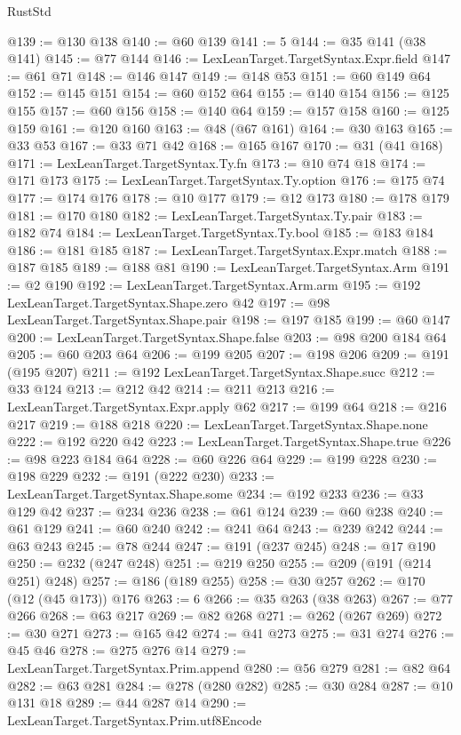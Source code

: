 \begin{lexlean}{RustStd}
\begin{coremodule}
{\begin{coremodule}
{{{{{{{{{{{{{{{{{{{{{{{{{{{{{{{{@139 := @130 @138
@140 := @60 @139
@141 := 5
@144 := @35 @141 (@38 @141)
@145 := @77 @144
@146 := LexLeanTarget.TargetSyntax.Expr.field
@147 := @61 @71
@148 := @146 @147
@149 := @148 @53
@151 := @60 @149 @64
@152 := @145 @151
@154 := @60 @152 @64
@155 := @140 @154
@156 := @125 @155
@157 := @60 @156
@158 := @140 @64
@159 := @157 @158
@160 := @125 @159
@161 := @120 @160
@163 := @48 (@67 @161)
@164 := @30 @163
@165 := @33 @53
@167 := @33 @71 @42
@168 := @165 @167
@170 := @31 (@41 @168)
@171 := LexLeanTarget.TargetSyntax.Ty.fn
@173 := @10 @74 @18
@174 := @171 @173
@175 := LexLeanTarget.TargetSyntax.Ty.option
@176 := @175 @74
@177 := @174 @176
@178 := @10 @177
@179 := @12 @173
@180 := @178 @179
@181 := @170 @180
@182 := LexLeanTarget.TargetSyntax.Ty.pair
@183 := @182 @74
@184 := LexLeanTarget.TargetSyntax.Ty.bool
@185 := @183 @184
@186 := @181 @185
@187 := LexLeanTarget.TargetSyntax.Expr.match
@188 := @187 @185
@189 := @188 @81
@190 := LexLeanTarget.TargetSyntax.Arm
@191 := @2 @190
@192 := LexLeanTarget.TargetSyntax.Arm.arm
@195 := @192 LexLeanTarget.TargetSyntax.Shape.zero @42
@197 := @98 LexLeanTarget.TargetSyntax.Shape.pair
@198 := @197 @185
@199 := @60 @147
@200 := LexLeanTarget.TargetSyntax.Shape.false
@203 := @98 @200 @184 @64
@205 := @60 @203 @64
@206 := @199 @205
@207 := @198 @206
@209 := @191 (@195 @207)
@211 := @192 LexLeanTarget.TargetSyntax.Shape.succ
@212 := @33 @124
@213 := @212 @42
@214 := @211 @213
@216 := LexLeanTarget.TargetSyntax.Expr.apply @62
@217 := @199 @64
@218 := @216 @217
@219 := @188 @218
@220 := LexLeanTarget.TargetSyntax.Shape.none
@222 := @192 @220 @42
@223 := LexLeanTarget.TargetSyntax.Shape.true
@226 := @98 @223 @184 @64
@228 := @60 @226 @64
@229 := @199 @228
@230 := @198 @229
@232 := @191 (@222 @230)
@233 := LexLeanTarget.TargetSyntax.Shape.some
@234 := @192 @233
@236 := @33 @129 @42
@237 := @234 @236
@238 := @61 @124
@239 := @60 @238
@240 := @61 @129
@241 := @60 @240
@242 := @241 @64
@243 := @239 @242
@244 := @63 @243
@245 := @78 @244
@247 := @191 (@237 @245)
@248 := @17 @190
@250 := @232 (@247 @248)
@251 := @219 @250
@255 := @209 (@191 (@214 @251) @248)
@257 := @186 (@189 @255)
@258 := @30 @257
@262 := @170 (@12 (@45 @173)) @176
@263 := 6
@266 := @35 @263 (@38 @263)
@267 := @77 @266
@268 := @63 @217
@269 := @82 @268
@271 := @262 (@267 @269)
@272 := @30 @271
@273 := @165 @42
@274 := @41 @273
@275 := @31 @274
@276 := @45 @46
@278 := @275 @276 @14
@279 := LexLeanTarget.TargetSyntax.Prim.append
@280 := @56 @279
@281 := @82 @64
@282 := @63 @281
@284 := @278 (@280 @282)
@285 := @30 @284
@287 := @10 @131 @18
@289 := @44 @287 @14
@290 := LexLeanTarget.TargetSyntax.Prim.utf8Encode
}}}}}}}}}}}}}}}}}}}}}}}}}}}}}}}}
\end{coremodule}}
\end{coremodule}
\end{lexlean}
